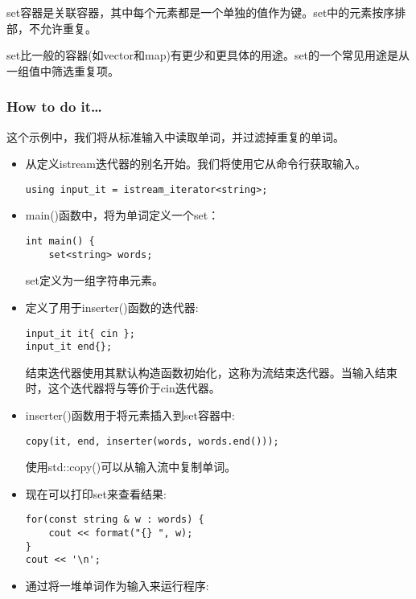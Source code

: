 
set容器是关联容器，其中每个元素都是一个单独的值作为键。set中的元素按序排部，不允许重复。

set比一般的容器(如vector和map)有更少和更具体的用途。set的一个常见用途是从一组值中筛选重复项。

\subsubsection{How to do it…}

这个示例中，我们将从标准输入中读取单词，并过滤掉重复的单词。

\begin{itemize}
\item 
从定义istream迭代器的别名开始。我们将使用它从命令行获取输入。

\begin{lstlisting}[style=styleCXX]
using input_it = istream_iterator<string>;
\end{lstlisting}

\item 
main()函数中，将为单词定义一个set：

\begin{lstlisting}[style=styleCXX]
int main() {
	set<string> words;
\end{lstlisting}

set定义为一组字符串元素。

\item 
定义了用于inserter()函数的迭代器:

\begin{lstlisting}[style=styleCXX]
input_it it{ cin };
input_it end{};
\end{lstlisting}

结束迭代器使用其默认构造函数初始化，这称为流结束迭代器。当输入结束时，这个迭代器将与等价于cin迭代器。

\item 
inserter()函数用于将元素插入到set容器中:

\begin{lstlisting}[style=styleCXX]
copy(it, end, inserter(words, words.end()));
\end{lstlisting}

使用std::copy()可以从输入流中复制单词。

\item 
现在可以打印set来查看结果:

\begin{lstlisting}[style=styleCXX]
for(const string & w : words) {
	cout << format("{} ", w);
}
cout << '\n';
\end{lstlisting}

\item 
通过将一堆单词作为输入来运行程序:

\end{itemize}


